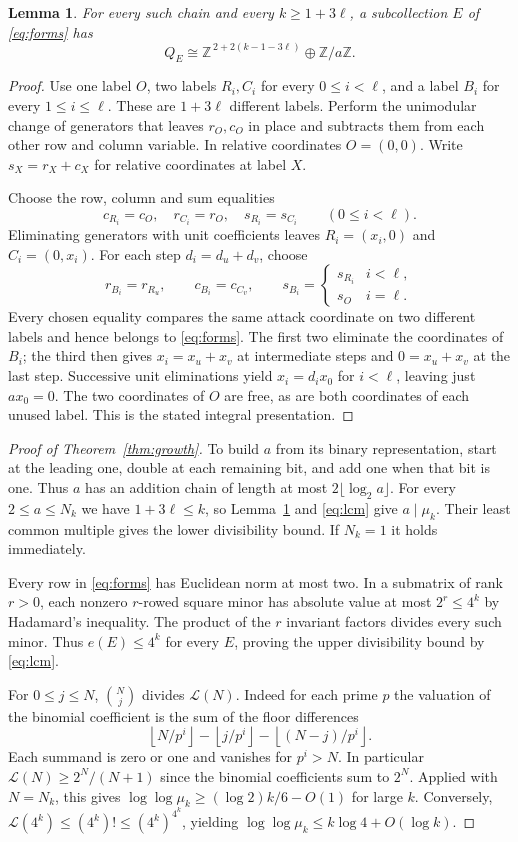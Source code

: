 \documentclass[10pt]{article}
\newtheorem{lemma}[theorem]{Lemma}
\newcommand{\Z}{\mathbb Z}
\newcommand{\LcmTo}[1]{\mathcal L(#1)}
\begin{document}
\begin{lemma}\label{lem:chain}
For every such chain and every $k\ge1+3\ell$, a subcollection $E$ of \eqref{eq:forms} has
\[
 Q_E\cong \Z^{\,2+2(k-1-3\ell)}\oplus\Z/a\Z.
\]
\end{lemma}
\begin{proof}
Use one label $O$, two labels $R_i,C_i$ for every $0\le i<\ell$, and a label $B_i$ for every $1\le i\le\ell$. These are $1+3\ell$ different labels. Perform the unimodular change of generators that leaves $r_O,c_O$ in place and subtracts them from each other row and column variable. In relative coordinates $O=(0,0)$. Write $s_X=r_X+c_X$ for relative coordinates at label $X$.

Choose the row, column and sum equalities
\[
 c_{R_i}=c_O,\quad r_{C_i}=r_O,\quad s_{R_i}=s_{C_i}\qquad(0\le i<\ell).
\]
Eliminating generators with unit coefficients leaves $R_i=(x_i,0)$ and $C_i=(0,x_i)$. For each step $d_i=d_u+d_v$, choose
\[
 r_{B_i}=r_{R_u},\qquad c_{B_i}=c_{C_v},\qquad
 s_{B_i}=\begin{cases}s_{R_i}&i<\ell,\\ s_O&i=\ell.\end{cases}
\]
Every chosen equality compares the same attack coordinate on two different labels and hence belongs to \eqref{eq:forms}. The first two eliminate the coordinates of $B_i$; the third then gives $x_i=x_u+x_v$ at intermediate steps and $0=x_u+x_v$ at the last step. Successive unit eliminations yield $x_i=d_ix_0$ for $i<\ell$, leaving just $a x_0=0$. The two coordinates of $O$ are free, as are both coordinates of each unused label. This is the stated integral presentation.
\end{proof}

\begin{proof}[Proof of Theorem~\ref{thm:growth}]
To build $a$ from its binary representation, start at the leading one, double at each remaining bit, and add one when that bit is one. Thus $a$ has an addition chain of length at most $2\lfloor\log_2a\rfloor$. For every $2\le a\le N_k$ we have $1+3\ell\le k$, so Lemma~\ref{lem:chain} and \eqref{eq:lcm} give $a\mid\mu_k$. Their least common multiple gives the lower divisibility bound. If $N_k=1$ it holds immediately.

Every row in \eqref{eq:forms} has Euclidean norm at most two. In a submatrix of rank $r>0$, each nonzero $r$-rowed square minor has absolute value at most $2^r\le4^k$ by Hadamard's inequality. The product of the $r$ invariant factors divides every such minor. Thus $e(E)\le4^k$ for every $E$, proving the upper divisibility bound by \eqref{eq:lcm}.

For $0\le j\le N$, $\binom Nj$ divides $\LcmTo N$. Indeed for each prime $p$ the valuation of the binomial coefficient is the sum of the floor differences
\[
 \left\lfloor N/p^i\right\rfloor-\left\lfloor j/p^i\right\rfloor-\left\lfloor(N-j)/p^i\right\rfloor.
\]
Each summand is zero or one and vanishes for $p^i>N$. In particular $\LcmTo N\ge2^N/(N+1)$ since the binomial coefficients sum to $2^N$. Applied with $N=N_k$, this gives $\log\log\mu_k\ge (\log 2)k/6-O(1)$ for large $k$. Conversely, $\LcmTo{4^k}\le(4^k)!\le(4^k)^{4^k}$, yielding $\log\log\mu_k\le k\log 4+O(\log k)$.
\end{proof}
\end{document}
